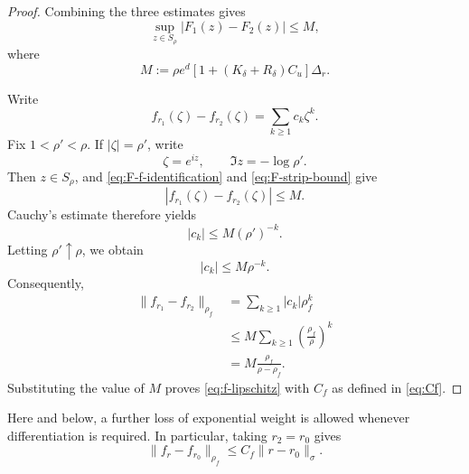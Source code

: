 \documentclass[11pt,a4paper]{amsart}
\begin{document}
\begin{proof}
	Combining the three estimates gives
	\begin{equation}\label{eq:F-strip-bound}
		\sup_{z\in S_\rho}
		|F_1(z)-F_2(z)|
		\le
		M,
	\end{equation}
	where
	\[
	M
	:=
	\rho e^d
	\left[
	1+(K_\delta+R_\delta)C_u
	\right]\Delta_r.
	\]
	
	Write
	\[
	f_{r_1}(\zeta)-f_{r_2}(\zeta)
	=
	\sum_{k\ge1}c_k\zeta^k.
	\]
	Fix $1<\rho'<\rho$.  If $|\zeta|=\rho'$, write
	\[
	\zeta=e^{iz},
	\qquad
	\Im z=-\log\rho'.
	\]
	Then $z\in S_\rho$, and \eqref{eq:F-f-identification} and
	\eqref{eq:F-strip-bound} give
	\[
	|f_{r_1}(\zeta)-f_{r_2}(\zeta)|
	\le M.
	\]
	Cauchy's estimate therefore yields
	\[
	|c_k|\le M(\rho')^{-k}.
	\]
	Letting $\rho'\uparrow\rho$, we obtain
	\[
	|c_k|\le M\rho^{-k}.
	\]
	Consequently,
	\[
	\begin{aligned}
		\|f_{r_1}-f_{r_2}\|_{\rho_f}
		&=
		\sum_{k\ge1}|c_k|\rho_f^k
		\\
		&\le
		M\sum_{k\ge1}
		\left(\frac{\rho_f}{\rho}\right)^k
		\\
		&=
		M\frac{\rho_f}{\rho-\rho_f}.
	\end{aligned}
	\]
	Substituting the value of $M$ proves
	\eqref{eq:f-lipschitz} with $C_f$ as defined in
	\eqref{eq:Cf}.
\end{proof}

Here and below, a further loss of exponential weight is allowed
whenever differentiation is required.
In particular, taking $r_2=r_0$ gives
\begin{equation}\label{eq:f-r0}
	\|f_r-f_{r_0}\|_{\rho_f}
	\le
	C_f\|r-r_0\|_\sigma.
\end{equation}
\end{document}
